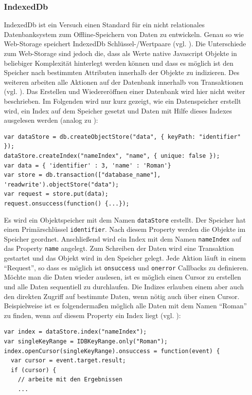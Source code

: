 \subsubsection*{IndexedDb}
IndexedDb ist ein Versuch einen Standard für ein nicht relationales Datenbanksystem zum Offline-Speichern von Daten zu entwickeln. Genau so wie Web-Storage speichert IndexedDb Schlüssel-/Wertpaare (vgl. \cite{Mehta2012}). Die Unterschiede zum Web-Storage sind jedoch die, dass als Werte native Javascript Objekte in beliebiger Komplexität hinterlegt werden können und dass es möglich ist den Speicher nach bestimmten Attributen innerhalb der Objekte zu indizieren. Des weiteren arbeiten alle Aktionen auf der Datenbank innerhalb von Transaktionen (vgl. \cite{MDN2011}). Das Erstellen und Wiedereröffnen einer Datenbank wird hier nicht weiter beschrieben. Im Folgenden wird nur kurz gezeigt, wie ein Datenspeicher erstellt wird, ein Index auf dem Speicher gesetzt und Daten mit Hilfe dieses Indexes ausgelesen werden (analog zu \cite{Mahemoff2010}):
\begin{lstlisting}
var dataStore = db.createObjectStore("data", { keyPath: "identifier" });
dataStore.createIndex("nameIndex", "name", { unique: false });
var data = { 'identifier' : 3, 'name' : 'Roman'}
var store = db.transaction(["database_name"], 'readwrite').objectStore("data");
var request = store.put(data);
request.onsuccess(function() {...});
\end{lstlisting}  
Es wird ein Objektspeicher mit dem Namen \texttt{dataStore} erstellt. Der Speicher hat einen Primärschlüssel \texttt{identifier}. Nach diesem Property werden die Objekte im Speicher geordnet. Anschließend wird ein Index mit dem Namen \texttt{nameIndex} auf das Property \texttt{name} angelegt. Zum Schreiben der Daten wird eine Transaktion gestartet und das Objekt wird in den Speicher gelegt. Jede Aktion läuft in einem "`Request"', so dass es möglich ist \texttt{onsuccess} und \texttt{onerror} Callbacks zu definieren. Möchte man die Daten wieder auslesen, ist es möglich einen Cursor zu erstellen und alle Daten sequentiell zu durchlaufen. Die Indizes erlauben einem aber auch den direkten Zugriff auf bestimmte Daten, wenn nötig auch über einen Cursor.  Beispielweise ist es folgendermaßen möglich alle Daten mit dem Namen "`Roman"' zu finden, wenn auf diesem Property ein Index liegt (vgl. \cite{MDN2011}):
\begin{lstlisting}
var index = dataStore.index("nameIndex");
var singleKeyRange = IDBKeyRange.only("Roman");
index.openCursor(singleKeyRange).onsuccess = function(event) {
  var cursor = event.target.result;
  if (cursor) {
    // arbeite mit den Ergebnissen
    ...
\end{lstlisting} 


